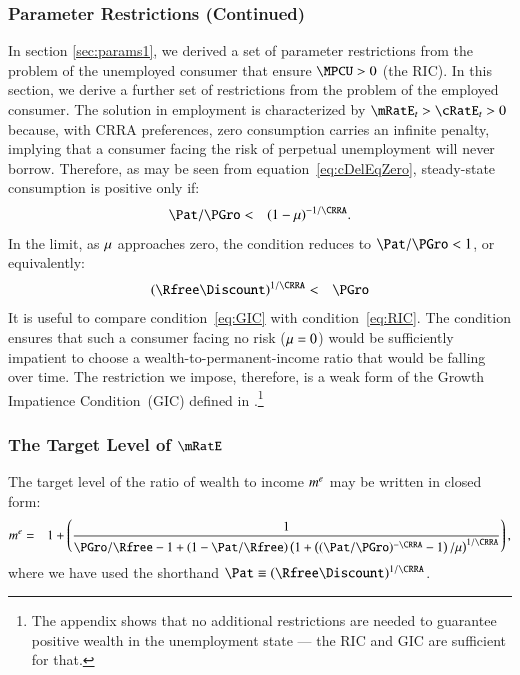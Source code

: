 \documentclass[titlepage,abstract]{\econtex}\newcommand{\texname}{ctDiscrete}
\begin{document}
\subsubsection{Parameter Restrictions (Continued)\label{sec:params2}}
In section \ref{sec:params1}, we derived a set of parameter restrictions from the problem of the unemployed consumer that ensure $\MPCU>0$ (the RIC). In this section, we derive a further set of restrictions from the problem of the employed consumer. The solution in employment is characterized by $\mRatE_{t} > \cRatE_{t} > 0$ because, with CRRA preferences, zero consumption carries an infinite penalty, implying that a consumer facing the risk of perpetual unemployment will never borrow. Therefore, as may be seen from equation~\eqref{eq:cDelEqZero}, steady-state consumption is positive only if:
\begin{eqnarray}
  \Pat/\PGro & < & (1-\urate)^{-1/\CRRA} 
\label{eq:PGroMod}
.
\end{eqnarray}
In the limit, as $\mu$ approaches zero, the condition reduces to $\Pat/\PGro<1$, or equivalently:
\begin{eqnarray}
(\Rfree\Discount)^{1/\CRRA}  & < & \PGro
\label{eq:GIC}
\end{eqnarray}
It is useful to compare condition~\eqref{eq:GIC} with condition~\eqref{eq:RIC}.
The condition ensures that such a consumer facing no risk ($\mu = 0$) would be sufficiently impatient to choose a wealth-to-permanent-income ratio that would be falling over time. The restriction we impose, therefore, is a weak form of the Growth Impatience Condition~(GIC) defined in \cite{BufferStockTheory}.\footnote{The appendix shows that no additional 
  restrictions are needed to guarantee positive wealth in the unemployment state --- the RIC and GIC are sufficient for that.}



\subsubsection{The Target Level of $\mRatE$ \label{sec:target} }
The target level of the ratio of wealth to income $m^{e}$ may be written in closed form:
\begin{eqnarray}
  \mTarg^{e} 
  & = & 
  1 + \left(\frac{1}{ \PGro/\Rfree - 1 + \left(1-\Pat/\Rfree\right) %
  \left(1+\left((\Pat/\PGro)^{-\CRRA}-1\right)/\urate\right)^{1/\CRRA}}\right) 
\label{eq:mTargetFormula}
,
\end{eqnarray}
where we have used the shorthand
$\Pat\equiv(\Rfree\Discount)^{1/\CRRA}$. 
\end{document}
